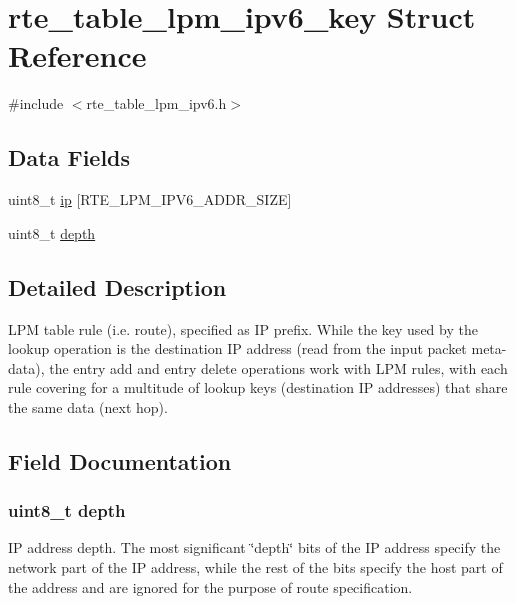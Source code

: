 \hypertarget{structrte__table__lpm__ipv6__key}{}\section{rte\+\_\+table\+\_\+lpm\+\_\+ipv6\+\_\+key Struct Reference}
\label{structrte__table__lpm__ipv6__key}


{\ttfamily \#include $<$rte\+\_\+table\+\_\+lpm\+\_\+ipv6.\+h$>$}

\subsection*{Data Fields}
\begin{DoxyCompactItemize}
\item 
uint8\+\_\+t \hyperlink{structrte__table__lpm__ipv6__key_aa53c1fe193ed5311bd6c16153b939a10}{ip} \mbox{[}R\+T\+E\+\_\+\+L\+P\+M\+\_\+\+I\+P\+V6\+\_\+\+A\+D\+D\+R\+\_\+\+S\+I\+Z\+E\mbox{]}
\item 
uint8\+\_\+t \hyperlink{structrte__table__lpm__ipv6__key_ab6f276082172be43a6041212071e377b}{depth}
\end{DoxyCompactItemize}


\subsection{Detailed Description}
L\+P\+M table rule (i.\+e. route), specified as I\+P prefix. While the key used by the lookup operation is the destination I\+P address (read from the input packet meta-\/data), the entry add and entry delete operations work with L\+P\+M rules, with each rule covering for a multitude of lookup keys (destination I\+P addresses) that share the same data (next hop). 

\subsection{Field Documentation}
\hypertarget{structrte__table__lpm__ipv6__key_ab6f276082172be43a6041212071e377b}{}
\subsubsection[{depth}]{\setlength{\rightskip}{0pt plus 5cm}uint8\+\_\+t depth}\label{structrte__table__lpm__ipv6__key_ab6f276082172be43a6041212071e377b}
I\+P address depth. The most significant \char`\"{}depth\char`\"{} bits of the I\+P address specify the network part of the I\+P address, while the rest of the bits specify the host part of the address and are ignored for the purpose of route specification. \hypertarget{structrte__table__lpm__ipv6__key_aa53c1fe193ed5311bd6c16153b939a10}{}
